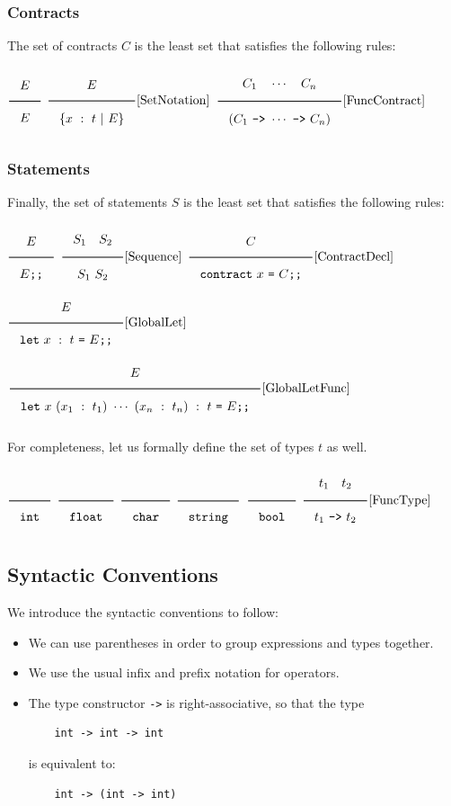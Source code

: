 \documentclass[a4paper]{article}
\newcommand{\Rule}[2]{\genfrac{}{}{0.7pt}{}{{\setlength{\fboxrule}{0pt}\setlength{\fboxsep}{3mm}\fbox{$#1$}}}{{\setlength{\fboxrule}{0pt}\setlength{\fboxsep}{3mm}\fbox{$#2$}}}}
\newcommand{\RuleWithName}[3]{\genfrac{}{}{0.7pt}{}{{\setlength{\fboxrule}{0pt}\setlength{\fboxsep}{3mm}\fbox{$#1$}}}{{\setlength{\fboxrule}{0pt}\setlength{\fboxsep}{3mm}\fbox{$#2$}}}[\text{#3}]}
\begin{document}
\subsubsection*{Contracts}

The set of contracts $C$ is the least set that satisfies the following rules:

$\Rule{E}{E}$
\hfill
$\RuleWithName{E}{\{x\ :\ t\ |\ E\}}{SetNotation}$
\hfill
$\RuleWithName{C_1\quad\cdots\quad C_n}{(C_1\ \texttt{->}\ \cdots\ \texttt{->}\ C_n)}{FuncContract}$

\subsubsection*{Statements}

Finally, the set of statements $S$ is the least set that satisfies the following rules:

$\Rule{E}{E\texttt{;;}}$
\hfill
$\RuleWithName{S_1\quad S_2}{S_1\ S_2}{Sequence}$
\hfill
$\RuleWithName{C}{\texttt{contract}\ x\ \texttt{=}\ C\texttt{;;}}{ContractDecl}$
\hfill
$\RuleWithName{E}{\texttt{let}\ x\ :\ t\ \texttt{=}\ E\texttt{;;}}{GlobalLet}$
\hfill
$\RuleWithName{E}{\texttt{let}\ x\ (x_1\ :\ t_1)\ \cdots\ (x_n\ :\ t_n)\ :\ t\ \texttt{=}\ E\texttt{;;}}{GlobalLetFunc}$

For completeness, let us formally define the set of types $t$ as well.

$\Rule{}{\texttt{int}}$
\hfill
$\Rule{}{\texttt{float}}$
\hfill
$\Rule{}{\texttt{char}}$
\hfill
$\Rule{}{\texttt{string}}$
\hfill
$\Rule{}{\texttt{bool}}$
\hfill
$\RuleWithName{t_1\quad t_2}{t_1\ \texttt{->}\ t_2}{FuncType}$

\subsection{Syntactic Conventions}

We introduce the syntactic conventions to follow:

\begin{itemize}
    \item We can use parentheses in order to group expressions and types together.
    \item We use the usual infix and prefix notation for operators.
    \item The type constructor \verb|->| is right-associative, so that the type
\begin{verbatim}
    int -> int -> int
\end{verbatim}
    is equivalent to:
\begin{verbatim}
    int -> (int -> int)
\end{verbatim}
\end{itemize}
\end{document}
